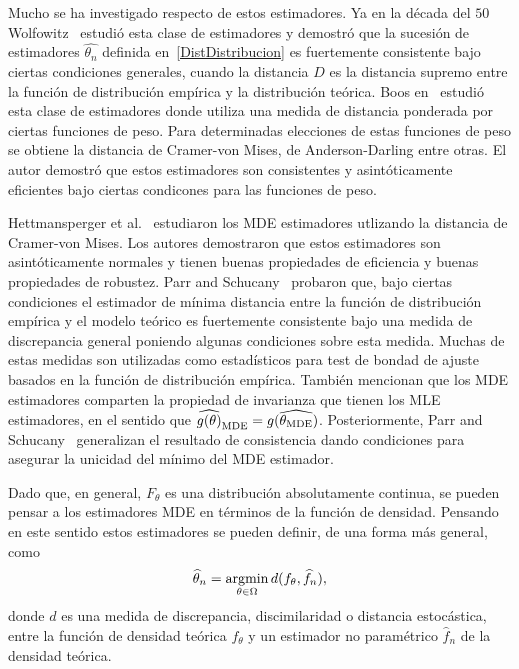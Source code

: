 Mucho se ha investigado respecto de estos estimadores. Ya en la década del $50$ Wolfowitz~\cite{wolfowitz1953, wolfowitz1957} estudió esta clase de estimadores y demostró que la sucesión de estimadores ${\widehat{\theta_n}}$ definida en~\ref{DistDistribucion} es fuertemente consistente bajo ciertas condiciones generales, cuando la distancia $D$ es la distancia supremo entre la función de distribución empírica y la distribución teórica.
Boos en~\cite{Boos1981} estudió esta clase de estimadores donde utiliza una medida de distancia ponderada por ciertas funciones de peso. Para determinadas elecciones de estas funciones de peso se obtiene la distancia de Cramer-von Mises, de Anderson-Darling entre otras. El autor demostró que estos estimadores son consistentes y asintóticamente eficientes bajo ciertas condicones para las funciones de peso.

Hettmansperger et al.~\cite{HettmanSperger1994} estudiaron los MDE estimadores utlizando la distancia de Cramer-von Mises. Los autores demostraron que estos estimadores son asintóticamente normales y tienen buenas propiedades de eficiencia y buenas propiedades de robustez. Parr and Schucany~\cite{Parr1980} probaron que, bajo ciertas condiciones el estimador de mínima distancia entre la función de distribución empírica y el modelo teórico es fuertemente consistente bajo una medida de discrepancia general poniendo algunas condiciones sobre esta medida. Muchas de estas medidas son utilizadas como estadísticos para test de bondad de ajuste basados en la función de distribución empírica. También mencionan que los MDE estimadores comparten la propiedad de invarianza que tienen los MLE estimadores, en el sentido que $\widehat{g(\theta)}_{\tiny{\text{MDE}}}=g(\widehat{\theta_{\tiny{\text{MDE}}}})$. Posteriormente, Parr and Schucany~\cite{parr1982} generalizan el resultado de consistencia dando condiciones para asegurar la unicidad del mínimo del MDE estimador.

Dado que, en general, $F_{\theta}$ es una distribución absolutamente continua, se pueden pensar a los estimadores MDE en términos de la función de densidad. Pensando en este sentido estos estimadores se pueden definir, de una forma más general, como 
\begin{align}
\widehat{\theta}_n=\mathop{\rm argmin} \limits_{\theta\in\Omega} d(f_{\theta}, \widehat{f}_n),
\end{align}
donde $d$ es una medida de discrepancia, discimilaridad o distancia estocástica, entre la función de densidad teórica $f_{\theta}$ y un estimador no paramétrico $\widehat{f}_n$ de la densidad teórica.

